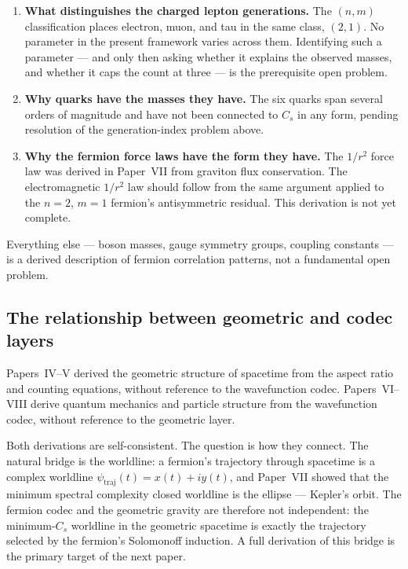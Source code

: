 \documentclass[11pt]{article}
\begin{document}
\begin{enumerate}
  \item \textbf{What distinguishes the charged lepton generations.}
        The $(n,m)$ classification places electron, muon, and tau in
        the same class, $(2,1)$.
        No parameter in the present framework varies across them.
        Identifying such a parameter --- and only then asking whether
        it explains the observed masses, and whether it caps the
        count at three --- is the prerequisite open problem.

  \item \textbf{Why quarks have the masses they have.}
        The six quarks span several orders of magnitude and have not
        been connected to $C_s$ in any form, pending resolution of
        the generation-index problem above.

  \item \textbf{Why the fermion force laws have the form they have.}
        The $1/r^2$ force law was derived in Paper~VII from graviton
        flux conservation.
        The electromagnetic $1/r^2$ law should follow from the same
        argument applied to the $n{=}2$, $m{=}1$ fermion's
        antisymmetric residual.
        This derivation is not yet complete.
\end{enumerate}

Everything else --- boson masses, gauge symmetry groups, coupling
constants --- is a derived description of fermion correlation
patterns, not a fundamental open problem.

\subsection{The relationship between geometric and codec layers}

Papers~IV--V derived the geometric structure of spacetime from the
aspect ratio and counting equations, without reference to the
wavefunction codec.
Papers~VI--VIII derive quantum mechanics and particle structure from
the wavefunction codec, without reference to the geometric layer.

Both derivations are self-consistent.
The question is how they connect.
The natural bridge is the worldline: a fermion's trajectory through
spacetime is a complex worldline $\psi_{\mathrm{traj}}(t) = x(t) + iy(t)$,
and Paper~VII showed that the minimum spectral complexity closed
worldline is the ellipse --- Kepler's orbit.
The fermion codec and the geometric gravity are therefore not
independent: the minimum-$C_s$ worldline in the geometric spacetime
is exactly the trajectory selected by the fermion's Solomonoff
induction.
A full derivation of this bridge is the primary target of the
next paper.
\end{document}
